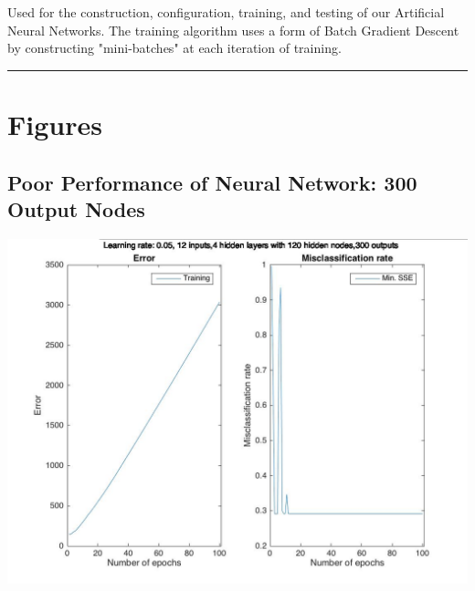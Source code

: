 \documentclass[12pt]{article}
\newcommand{\horizontalLine}{
	\begin{center}
		\hrule width 1.0\textwidth
	\end{center}
}
\begin{document}
Used for the construction, configuration, training, and testing of our Artificial Neural Networks. The training algorithm uses a form of Batch Gradient Descent by constructing "mini-batches" at each iteration of training.

\appendix

\horizontalLine
\section{Figures}
\label{sec:figures}

\subsection{Poor Performance of Neural Network: 300 Output Nodes}
\label{subsec:annPoorPerformance}
\includegraphics[scale=0.45]{images/ann/horribleResultsWIth300Outputs}
\end{document}
